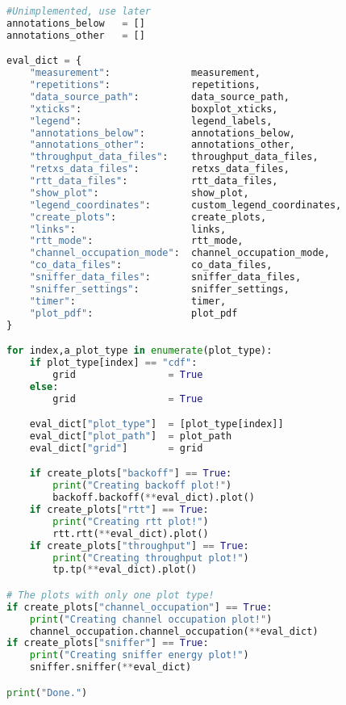 \begin{lstlisting}[language=Python,caption=evaluation.py]
#Unimplemented, use later
annotations_below   = []
annotations_other   = []

eval_dict = {
    "measurement":              measurement,
    "repetitions":              repetitions,
    "data_source_path":         data_source_path,
    "xticks":                   boxplot_xticks,
    "legend":                   legend_labels,
    "annotations_below":        annotations_below,
    "annotations_other":        annotations_other,
    "throughput_data_files":    throughput_data_files,
    "retxs_data_files":         retxs_data_files,
    "rtt_data_files":           rtt_data_files,
    "show_plot":                show_plot,
    "legend_coordinates":       custom_legend_coordinates,
    "create_plots":             create_plots,
    "links":                    links,
    "rtt_mode":                 rtt_mode,
    "channel_occupation_mode":  channel_occupation_mode,
    "co_data_files":            co_data_files,
    "sniffer_data_files":       sniffer_data_files,
    "sniffer_settings":         sniffer_settings,
    "timer":                    timer,
    "plot_pdf":                 plot_pdf
}

for index,a_plot_type in enumerate(plot_type):
    if plot_type[index] == "cdf":
        grid                = True
    else:
        grid                = True

    eval_dict["plot_type"]  = [plot_type[index]]
    eval_dict["plot_path"]  = plot_path
    eval_dict["grid"]       = grid

    if create_plots["backoff"] == True:
        print("Creating backoff plot!")
        backoff.backoff(**eval_dict).plot()
    if create_plots["rtt"] == True:
        print("Creating rtt plot!")
        rtt.rtt(**eval_dict).plot()
    if create_plots["throughput"] == True:
        print("Creating throughput plot!")
        tp.tp(**eval_dict).plot()

# The plots with only one plot type!
if create_plots["channel_occupation"] == True:
    print("Creating channel occupation plot!")
    channel_occupation.channel_occupation(**eval_dict)
if create_plots["sniffer"] == True:
    print("Creating sniffer energy plot!")
    sniffer.sniffer(**eval_dict)

print("Done.")
\end{lstlisting}

